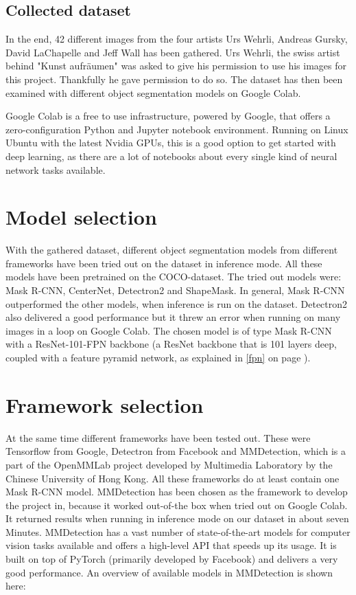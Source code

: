 \subsection{Collected dataset}

In the end, 42 different images from the four artists Urs Wehrli, Andreas Gursky, David LaChapelle and Jeff Wall has been gathered. Urs Wehrli, the swiss artist behind "Kunst aufräumen" was asked to give his permission to use his images for this project. Thankfully he gave permission to do so. The dataset has then been examined with different object segmentation models on Google Colab.

Google Colab is a free to use infrastructure, powered by Google, that offers a zero-configuration Python and Jupyter notebook environment. Running on Linux Ubuntu with the latest Nvidia GPUs, this is a good option to get started with deep learning, as there are a lot of notebooks about every single kind of neural network tasks available.

\section{Model selection}

With the gathered dataset, different object segmentation models from different frameworks have been tried out on the dataset in inference mode. All these models have been pretrained on the COCO-dataset.
The tried out models were: Mask R-CNN, CenterNet, Detectron2 and ShapeMask. In general, Mask R-CNN outperformed the other models, when inference is run on the dataset. Detectron2 also delivered a good performance but it threw an error when running on many images in a loop on Google Colab. The chosen model is of type Mask R-CNN with a ResNet-101-FPN backbone (a ResNet backbone that is 101 layers deep, coupled with a feature pyramid network, as explained in \ref{fpn} on page \pageref{fpn}).

\section{Framework selection}

At the same time different frameworks have been tested out. These were Tensorflow from Google, Detectron from Facebook and MMDetection, which is a part of the OpenMMLab project developed by Multimedia Laboratory by the Chinese University of Hong Kong. All these frameworks do at least contain one Mask R-CNN model. MMDetection has been chosen as the framework to develop the project in, because it worked out-of-the box when tried out on Google Colab. It returned results when running in inference mode on our dataset in about seven Minutes. MMDetection has a vast number of state-of-the-art models for computer vision tasks available and offers a high-level API that speeds up its usage. It is built on top of PyTorch (primarily developed by Facebook) and delivers a very good performance. An overview of available models in MMDetection is shown here:


